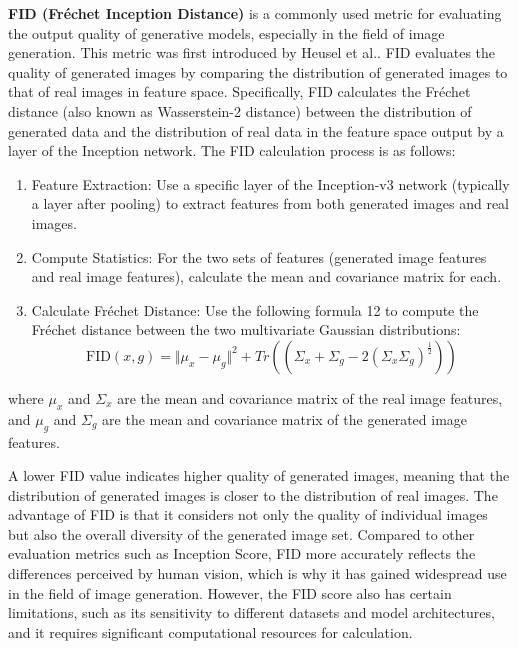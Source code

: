 \documentclass[preprint,12pt]{elsarticle}
\begin{document}
\textbf{FID (Fréchet Inception Distance)} is a commonly used metric for evaluating the output quality of generative models, especially in the field of image generation. This metric was first introduced by Heusel et al.\citep{74heusel2017gans}. FID evaluates the quality of generated images by comparing the distribution of generated images to that of real images in feature space. Specifically, FID calculates the Fréchet distance (also known as Wasserstein-2 distance) between the distribution of generated data and the distribution of real data in the feature space output by a layer of the Inception network. The FID calculation process is as follows:
\begin{enumerate}
    \item  Feature Extraction: Use a specific layer of the Inception-v3 network (typically a layer after pooling) to extract features from both generated images and real images.
    \item Compute Statistics: For the two sets of features (generated image features and real image features), calculate the mean and covariance matrix for each.
    \item Calculate Fréchet Distance: Use the following formula 12 to compute the Fréchet distance between the two multivariate Gaussian distributions:
    \begin{equation}
        \label{FID_equation}
        \text{FID}(x, g) = \Vert\mu_x - \mu_g\Vert^2 + Tr\left((\Sigma_x + \Sigma_g - 2(\Sigma_x\Sigma_g)^{\frac{1}{2}})\right)
    \end{equation}
\end{enumerate}
where $ \mu_x$ and $\Sigma_x $ are the mean and covariance matrix of the real image features, and $\mu_g$ and $\Sigma_g$ are the mean and covariance matrix of the generated image features.

A lower FID value indicates higher quality of generated images, meaning that the distribution of generated images is closer to the distribution of real images. The advantage of FID is that it considers not only the quality of individual images but also the overall diversity of the generated image set. Compared to other evaluation metrics such as Inception Score, FID more accurately reflects the differences perceived by human vision, which is why it has gained widespread use in the field of image generation. However, the FID score also has certain limitations, such as its sensitivity to different datasets and model architectures, and it requires significant computational resources for calculation.
\end{document}
